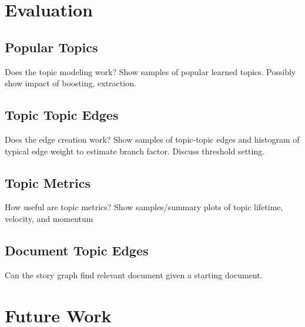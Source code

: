 \documentclass[10pt,twocolumn]{article}
\begin{document}
\section {Evaluation}

\subsection {Popular Topics}
Does the topic modeling work? Show samples of popular learned topics.  Possibly show impact of boosting, extraction.

\subsection {Topic Topic Edges}
Does the edge creation work?  Show samples of topic-topic edges and histogram of typical edge weight to estimate branch factor.  Discuss threshold setting.

\subsection {Topic Metrics}
How useful are topic metrics? Show samples/summary plots of topic lifetime, velocity, and momentum

\subsection {Document Topic Edges}
Can the story graph find relevant document given a starting document.

\section {Future Work}
\end{document}
